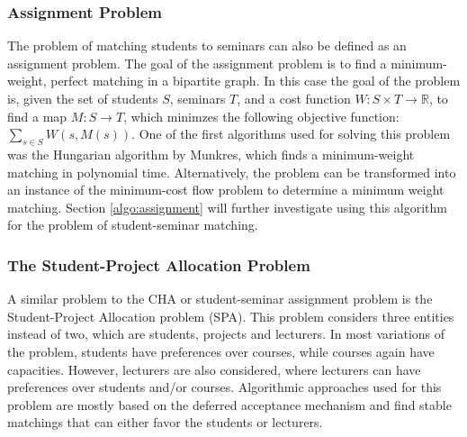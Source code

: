 \subsubsection{Assignment Problem}\label{intro_assignment}
The problem of matching students to seminars can also be defined as an assignment problem. The goal of the assignment problem is to find a minimum-weight, perfect matching in a bipartite graph. In this case the goal of the problem is, given the set of students $S$, seminars $T$, and a cost function $W: S \times T \rightarrow \mathbb{R}$, to find a map $M: S \rightarrow T$, which minimzes the following objective function:
$\sum_{s \in S} W(s, M(s))$.
\newline
One of the first algorithms used for solving this problem was the Hungarian algorithm by Munkres, which finds a minimum-weight matching in polynomial time.\cite{Munkres} 
\newline
Alternatively, the problem can be transformed into an instance of the minimum-cost flow problem to determine a minimum weight matching. Section \ref{algo:assignment} will further investigate using this algorithm for the problem of student-seminar matching.

\subsubsection{The Student-Project Allocation Problem}
A similar problem to the CHA or student-seminar assignment problem is the Student-Project Allocation problem (SPA). This problem considers three entities instead of two, which are students, projects and lecturers. In most variations of the problem, students have preferences over courses, while courses again have capacities. However, lecturers are also considered, where lecturers can have preferences over students and/or courses. Algorithmic approaches used for this problem are mostly based on the deferred acceptance mechanism and find stable matchings that can either favor the students or lecturers.\cite{algorithmics} 